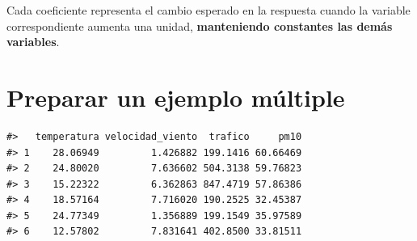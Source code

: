 \documentclass[
  spanish,
  10.5pt,
  letterpaper,
  openany,
  headings=big]{scrbook}
\newenvironment{Shaded}{}{}
\newcommand{\AttributeTok}[1]{\textcolor[rgb]{0.84,0.23,0.29}{#1}}
\newcommand{\DecValTok}[1]{\textcolor[rgb]{0.00,0.36,0.77}{#1}}
\newcommand{\FloatTok}[1]{\textcolor[rgb]{0.00,0.36,0.77}{#1}}
\newcommand{\FunctionTok}[1]{\textcolor[rgb]{0.44,0.26,0.76}{#1}}
\newcommand{\NormalTok}[1]{\textcolor[rgb]{0.14,0.16,0.18}{#1}}
\newcommand{\OtherTok}[1]{\textcolor[rgb]{0.44,0.26,0.76}{#1}}
\newcommand{\SpecialCharTok}[1]{\textcolor[rgb]{0.00,0.36,0.77}{#1}}
\begin{document}
Cada coeficiente representa el cambio esperado en la respuesta cuando la
variable correspondiente aumenta una unidad, \textbf{manteniendo
constantes las demás variables}.

\section{Preparar un ejemplo
múltiple}\label{preparar-un-ejemplo-muxfaltiple}

\begin{Shaded}
\end{Shaded}

\begin{verbatim}
#>   temperatura velocidad_viento  trafico     pm10
#> 1    28.06949         1.426882 199.1416 60.66469
#> 2    24.80020         7.636602 504.3138 59.76823
#> 3    15.22322         6.362863 847.4719 57.86386
#> 4    18.57164         7.716020 190.2525 32.45387
#> 5    24.77349         1.356889 199.1549 35.97589
#> 6    12.57802         7.831641 402.8500 33.81511
\end{verbatim}
\end{document}
